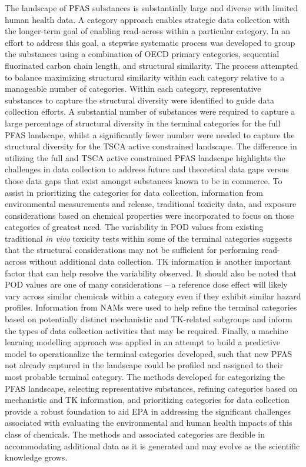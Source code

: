 \documentclass[
  super,
  preprint,
  3p]{elsarticle}
\begin{document}
The landscape of PFAS substances is substantially large and diverse with
limited human health data. A category approach enables strategic data
collection with the longer-term goal of enabling read-across within a
particular category. In an effort to address this goal, a stepwise
systematic process was developed to group the substances using a
combination of OECD primary categories, sequential fluorinated carbon
chain length, and structural similarity. The process attempted to
balance maximizing structural similarity within each category relative
to a manageable number of categories. Within each category,
representative substances to capture the structural diversity were
identified to guide data collection efforts. A substantial number of
substances were required to capture a large percentage of structural
diversity in the terminal categories for the full PFAS landscape, whilst
a significantly fewer number were needed to capture the structural
diversity for the TSCA active constrained landscape. The difference in
utilizing the full and TSCA active constrained PFAS landscape highlights
the challenges in data collection to address future and theoretical data
gaps versus those data gaps that exist amongst substances known to be in
commerce. To assist in prioritizing the categories for data collection,
information from environmental measurements and release, traditional
toxicity data, and exposure considerations based on chemical properties
were incorporated to focus on those categories of greatest need. The
variability in POD values from existing traditional \emph{in vivo}
toxicity tests within some of the terminal categories suggests that the
structural considerations may not be sufficient for performing
read-across without additional data collection. TK information is
another important factor that can help resolve the variability observed.
It should also be noted that POD values are one of many considerations
-- a reference dose effect will likely vary across similar chemicals
within a category even if they exhibit similar hazard profiles.
Information from NAMs were used to help refine the terminal categories
based on potentially distinct mechanistic and TK-related subgroups and
inform the types of data collection activities that may be required.
Finally, a machine learning modelling approach was applied in an attempt
to build a predictive model to operationalize the terminal categories
developed, such that new PFAS not already captured in the landscape
could be profiled and assigned to their most probable terminal category.
The methods developed for categorizing the PFAS landscape, selecting
representative substances, refining categories based on mechanistic and
TK information, and prioritizing categories for data collection provide
a robust foundation to aid EPA in addressing the significant challenges
associated with evaluating the environmental and human health impacts of
this class of chemicals. The methods and associated categories are
flexible in accommodating additional data as it is generated and may
evolve as the scientific knowledge grows.
\end{document}
